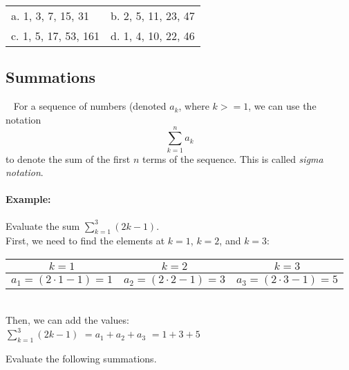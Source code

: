 {\begin{questionNOGRADE}{\thequestion}
        \begin{center}
            \begin{tabular}{p{6cm} p{6cm}}
                a. 1, 3, 7, 15, 31 &
                b. 2, 5, 11, 23, 47 \\
                c. 1, 5, 17, 53, 161 &
                d. 1, 4, 10, 22, 46
            \end{tabular}
        \end{center}
    \end{questionNOGRADE}

    \newpage
    
    \subsection{Summations}
    \begin{intro}{\ }
        For a sequence of numbers (denoted $a_{k}$, where $k >= 1$,
        we can use the notation
        $$\sum_{k=1}^{n} a_{k}$$
        to denote the sum of the first $n$ terms of the sequence.
        This is called \textit{sigma notation}.

        \paragraph{Example:} Evaluate the sum $\sum_{k=1}^{3}(2k-1)$. ~\\
        First, we need to find the elements at $k=1$, $k=2$, and $k=3$:

        \begin{center}
            \begin{tabular}{| c | c | c |}
                \hline
                \textbf{ $k=1$ } & \textbf{ $k=2$ } & \textbf{ $k=3$ } \\
                \hline
                $a_{1} = (2 \cdot 1 - 1) = 1$ &
                $a_{2} = (2 \cdot 2 - 1) = 3$ &
                $a_{3} = (2 \cdot 3 - 1) = 5$
                \\
                \hline
            \end{tabular}
        \end{center}
        ~\\
        Then, we can add the values: \\
        $\sum_{k=1}^{3}(2k-1) $ \tab
        $= a_{1} + a_{2} + a_{3}$ \tab
        $= 1 + 3 + 5 $ \tab
    \end{intro}


    \begin{questionNOGRADE}{\thequestion}
        Evaluate the following summations.


\end{questionNOGRADE}}
